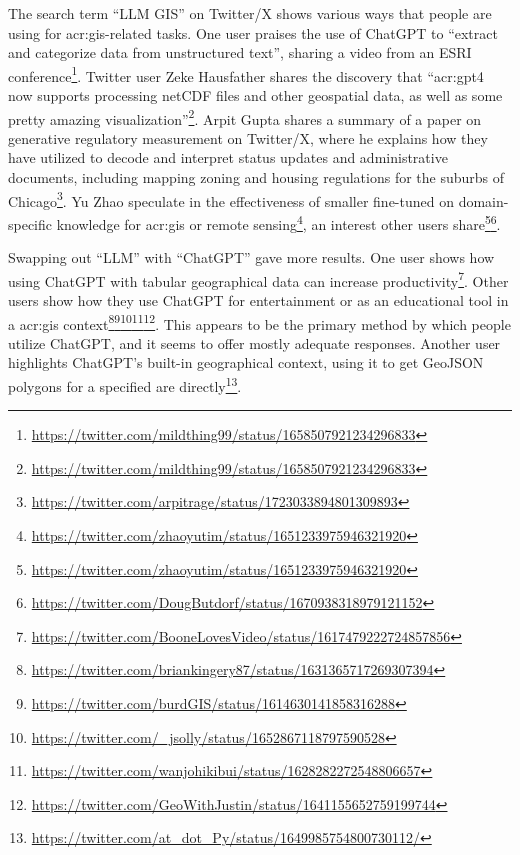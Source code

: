 The search term \enquote{LLM GIS} on Twitter/X shows various ways that people are using  for \acrshort{acr:gis}-related tasks. One user praises the use of ChatGPT to \enquote{extract and categorize data from unstructured text}, sharing a video from an ESRI conference\footnote{\url{https://twitter.com/mildthing99/status/1658507921234296833}}. Twitter user Zeke Hausfather shares the discovery that \enquote{\acrshort{acr:gpt}4 now supports processing netCDF files and other geospatial data, as well as some pretty amazing visualization}\footnote{\url{https://twitter.com/mildthing99/status/1658507921234296833}}. Arpit Gupta shares a summary of a paper on generative regulatory measurement on Twitter/X, where he explains how they have utilized  to decode and interpret status updates and administrative documents, including mapping zoning and housing regulations for the suburbs of Chicago\footnote{\url{https://twitter.com/arpitrage/status/1723033894801309893}}. Yu Zhao speculate in the effectiveness of smaller  fine-tuned on domain-specific knowledge for \acrshort{acr:gis} or remote sensing\footnote{\url{https://twitter.com/zhaoyutim/status/1651233975946321920}}, an interest other users share\footnote{\url{https://twitter.com/zhaoyutim/status/1651233975946321920}}\footnote{\url{https://twitter.com/DougButdorf/status/1670938318979121152}}.

Swapping out \enquote{LLM} with \enquote{ChatGPT} gave more results. One user shows how using ChatGPT with tabular geographical data can increase productivity\footnote{\url{https://twitter.com/BooneLovesVideo/status/1617479222724857856}}. Other users show how they use ChatGPT for entertainment  or as an educational tool in a \acrshort{acr:gis} context\footnote{\url{https://twitter.com/briankingery87/status/1631365717269307394}}\footnote{\url{https://twitter.com/burdGIS/status/1614630141858316288}}\footnote{\url{https://twitter.com/_jsolly/status/1652867118797590528}}\footnote{\url{https://twitter.com/wanjohikibui/status/1628282272548806657}}\footnote{\url{https://twitter.com/GeoWithJustin/status/1641155652759199744}}. This appears to be the primary method by which people utilize ChatGPT, and it seems to offer mostly adequate responses. Another user highlights ChatGPT's built-in geographical context, using it to get GeoJSON polygons for a specified are directly\footnote{\url{https://twitter.com/at_dot_Py/status/1649985754800730112/}}.

